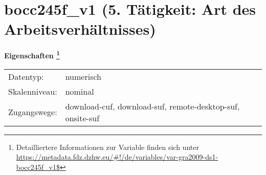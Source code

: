 
    \setcounter{footnote}{0}

    \vspace*{-1.8cm}
	\section{bocc245f\_v1 (5. Tätigkeit: Art des Arbeitsverhältnisses)}
	\label{section:bocc245f_v1}



    \vspace*{0.5cm}
    \noindent\textbf{Eigenschaften
	\footnote{Detailliertere Informationen zur Variable finden sich unter
		\url{https://metadata.fdz.dzhw.eu/\#!/de/variables/var-gra2009-ds1-bocc245f_v1$}}}\\
	\begin{tabularx}{\hsize}{@{}lX}
	Datentyp: & numerisch \\
	Skalenniveau: & nominal \\
	Zugangswege: &
	  download-cuf, 
	  download-suf, 
	  remote-desktop-suf, 
	  onsite-suf
 \\
    \end{tabularx}



